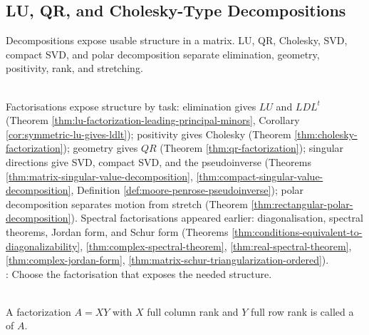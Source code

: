 \subsection{LU, QR, and Cholesky-Type Decompositions}

%

Decompositions expose usable structure in a matrix. LU, QR, Cholesky, SVD, compact SVD, and polar decomposition separate elimination, geometry, positivity, rank, and stretching.

\begin{perspective} \label{per:matrix-factorization-roadmap} \\
Factorisations expose structure by task: elimination gives $LU$ and $LDL^t$ (Theorem \ref{thm:lu-factorization-leading-principal-minors}, Corollary \ref{cor:symmetric-lu-gives-ldlt}); positivity gives Cholesky (Theorem \ref{thm:cholesky-factorization}); geometry gives $QR$ (Theorem \ref{thm:qr-factorization}); singular directions give SVD, compact SVD, and the pseudoinverse (Theorems \ref{thm:matrix-singular-value-decomposition}, \ref{thm:compact-singular-value-decomposition}, Definition \ref{def:moore-penrose-pseudoinverse}); polar decomposition separates motion from stretch (Theorem \ref{thm:rectangular-polar-decomposition}). Spectral factorisations appeared earlier: diagonalisation, spectral theorems, Jordan form, and Schur form (Theorems \ref{thm:conditions-equivalent-to-diagonalizability}, \ref{thm:complex-spectral-theorem}, \ref{thm:real-spectral-theorem}, \ref{thm:complex-jordan-form}, \ref{thm:matrix-schur-triangularization-ordered}).\\
: Choose the factorisation that exposes the needed structure.
\end{perspective}

\begin{definition} \label{def:full-rank-factorization} \\
A factorization $A=XY$ with $X$ full column rank and $Y$ full row rank is called a  of $A$.
\end{definition}

